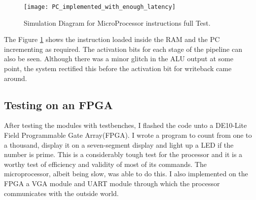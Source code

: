 \begin{figure}
    \centering
    \texttt{[image: PC\_implemented\_with\_enough\_latency]}
	\caption{Simulation Diagram for MicroProcessor instructions full Test.}
    \label{fig:sim_cpu_3}
\end{figure}

The Figure \ref{fig:sim_cpu_3} shows the instruction loaded inside the RAM and the PC incrementing as required. The activation bits for each stage of the pipeline can also be seen. Although there was a minor glitch in the ALU output at some point, the system rectified this before the activation bit for writeback came around. 

\subsection{Testing on an FPGA}
After testing the modules with testbenches, I flashed the code unto a DE10-Lite Field Programmable Gate Array(FPGA). I wrote a program to count from one to a  thousand, display it on a seven-segment display and light up a LED if the number is prime. This is a considerably tough test for the processor and it is a worthy test of efficiency and validity of most of its commands. The microprocessor, albeit being slow, was able to do this. I also implemented on the FPGA a VGA module and UART module through which the processor communicates with the outside world.

